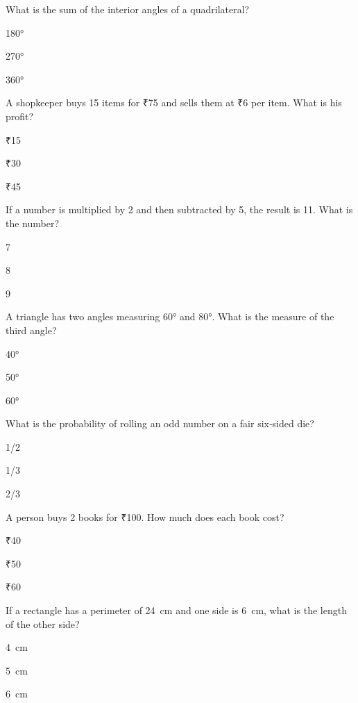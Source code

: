 \begin{enhancedmcq}{What is the sum of the interior angles of a quadrilateral?}
\item 180°
\item 270°
\item 360°

\end{enhancedmcq}
\begin{enhancedmcq}{A shopkeeper buys 15 items for ₹75 and sells them at ₹6 per item. What is his profit?}
\item ₹15
\item ₹30
\item ₹45

\end{enhancedmcq}
\begin{enhancedmcq}{If a number is multiplied by 2 and then subtracted by 5, the result is 11. What is the number?}
\item 7
\item 8
\item 9

\end{enhancedmcq}
\begin{enhancedmcq}{A triangle has two angles measuring 60° and 80°. What is the measure of the third angle?}
\item 40°
\item 50°
\item 60°

\end{enhancedmcq}
\begin{enhancedmcq}{What is the probability of rolling an odd number on a fair six‑sided die?}
\item 1/2
\item 1/3
\item 2/3

\end{enhancedmcq}
\begin{enhancedmcq}{A person buys 2 books for ₹100. How much does each book cost?}
\item ₹40
\item ₹50
\item ₹60

\end{enhancedmcq}
\begin{enhancedmcq}{If a rectangle has a perimeter of 24 cm and one side is 6 cm, what is the length of the other side?}
\item 4 cm
\item 5 cm
\item 6 cm

\end{enhancedmcq}
